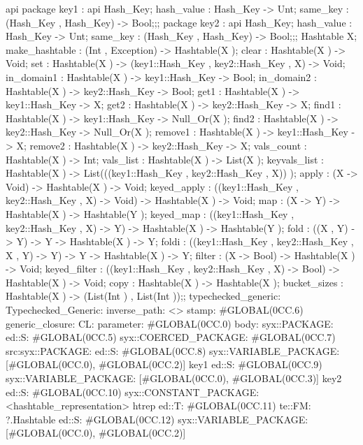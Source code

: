 api {   package key1
          : api {
                Hash_Key;
                hash_value : Hash_Key -> Unt;
                same_key : (Hash_Key , Hash_Key) -> Bool;};;
        package key2
          : api {
                Hash_Key;
                hash_value : Hash_Key -> Unt;
                same_key : (Hash_Key , Hash_Key) -> Bool;};;
    Hashtable X;
    make_hashtable : (Int , Exception) -> Hashtable(X );
    clear : Hashtable(X ) -> Void;
    set : Hashtable(X ) -> (key1::Hash_Key , key2::Hash_Key , X) -> Void;
    in_domain1 : Hashtable(X ) -> key1::Hash_Key -> Bool;
    in_domain2 : Hashtable(X ) -> key2::Hash_Key -> Bool;
    get1 : Hashtable(X ) -> key1::Hash_Key -> X;
    get2 : Hashtable(X ) -> key2::Hash_Key -> X;
    find1 : Hashtable(X ) -> key1::Hash_Key -> Null_Or(X );
    find2 : Hashtable(X ) -> key2::Hash_Key -> Null_Or(X );
    remove1 : Hashtable(X ) -> key1::Hash_Key -> X;
    remove2 : Hashtable(X ) -> key2::Hash_Key -> X;
    vals_count : Hashtable(X ) -> Int;
    vals_list : Hashtable(X ) -> List(X );
    keyvals_list : Hashtable(X ) -> List(((key1::Hash_Key , key2::Hash_Key , X)) );
    apply : (X -> Void) -> Hashtable(X ) -> Void;
    keyed_apply : ((key1::Hash_Key , key2::Hash_Key , X) -> Void) -> Hashtable(X ) -> Void;
    map : (X -> Y) -> Hashtable(X ) -> Hashtable(Y );
    keyed_map : ((key1::Hash_Key , key2::Hash_Key , X) -> Y) -> Hashtable(X ) -> Hashtable(Y );
    fold : ((X , Y) -> Y) -> Y -> Hashtable(X ) -> Y;
    foldi : ((key1::Hash_Key , key2::Hash_Key , X , Y) -> Y) -> Y -> Hashtable(X ) -> Y;
    filter : (X -> Bool) -> Hashtable(X ) -> Void;
    keyed_filter : ((key1::Hash_Key , key2::Hash_Key , X) -> Bool) -> Hashtable(X ) -> Void;
    copy : Hashtable(X ) -> Hashtable(X );
    bucket_sizes : Hashtable(X ) -> (List(Int ) , List(Int ));};
typechecked_generic:
Typechecked_Generic:
inverse_path: <>
stamp: #GLOBAL(0CC.6)
generic_closure:
CL:
parameter: #GLOBAL(0CC.0)
body: syx::PACKAGE:
        ed::S: #GLOBAL(0CC.5)
            syx::COERCED_PACKAGE:
                #GLOBAL(0CC.7)
                 src:syx::PACKAGE:
                        ed::S: #GLOBAL(0CC.8) syx::VARIABLE_PACKAGE: [#GLOBAL(0CC.0), #GLOBAL(0CC.2)] key1
                        ed::S: #GLOBAL(0CC.9) syx::VARIABLE_PACKAGE: [#GLOBAL(0CC.0), #GLOBAL(0CC.3)] key2
                        ed::S: #GLOBAL(0CC.10) syx::CONSTANT_PACKAGE: <hashtable_representation> htrep
                        ed::T: #GLOBAL(0CC.11) te::FM: ?.Hashtable
                    ed::S: #GLOBAL(0CC.12)
                     syx::VARIABLE_PACKAGE:
                     [#GLOBAL(0CC.0), #GLOBAL(0CC.2)]
